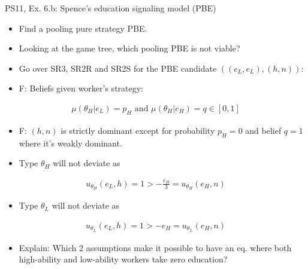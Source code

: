 \begin{frame}{PS11, Ex. 6.b: Spence’s education signaling model (PBE)}
    \begin{multicols}{2}
      \begin{itemize}
        \item[(b)] Find a pooling pure strategy PBE.
        \item[Step 1:] Looking at the game tree, which pooling PBE is not viable?
        \item[Step 2:] Go over SR3, SR2R and SR2S for the PBE candidate $((e_L,e_L),(h,n))$:
        \item[SR3:] F: Beliefs given worker's strategy:
      \end{itemize}\vspace{-10pt}
      \begin{align*}
        \mu(\theta_H|e_L)=p_H\text{ and }\mu(\theta_H|e_H)=q\in[0,1]
      \end{align*}\vspace{-20pt}
      \begin{itemize}
        \item[SR2R:] F: $(h,n)$ is strictly dominant except for probability $p_H=0$ and belief $q=1$ where it's weakly dominant.
        \item[SR2S:] Type $\theta_H$ will not deviate as
      \end{itemize}\vspace{-12pt}
      \begin{align*}
        u_{\theta_H}(e_L,h)=1>-\frac{e_H}{3}=u_{\theta_H}(e_H,n)
      \end{align*}\vspace{-20pt}
      \begin{itemize}
        \item[] Type $\theta_L$ will not deviate as
      \end{itemize}\vspace{-12pt}
      \begin{align*}
        u_{\theta_L}(e_L,h)=1>-e_H=u_{\theta_L}(e_H,n)
      \end{align*}\vspace{-21pt}
      \begin{itemize}
        \item[Step 3:] Explain: Which 2 assumptions make it possible to have an eq. where both high-ability and low-ability workers take zero education?
      \end{itemize}
      \vfill\null\columnbreak
      \begin{figure}[!h]

\end{figure}
\end{multicols}
\end{frame}
